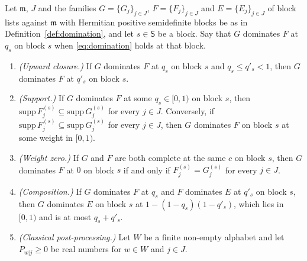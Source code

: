 
\begin{lemma}\label{lem:domination}
Let $\mathfrak{m}$, $J$ and the families $G=\{G_j\}_{j\in J}$,
$F=\{F_j\}_{j\in J}$ and $E=\{E_j\}_{j\in J}$ of block lists against
$\mathfrak{m}$ with Hermitian positive semidefinite blocks be as in
Definition~\ref{def:domination}, and let $s\in\mathsf{S}$ be a block.
Say that $G$ dominates $F$ at $q_s$ on block $s$ when
\eqref{eq:domination} holds at that block.
\begin{enumerate}[label=(\roman*),leftmargin=2.4em]
\item \emph{(Upward closure.)} If $G$ dominates $F$ at $q_s$ on block $s$ and
  $q_s\le q'_s<1$, then $G$ dominates $F$ at $q'_s$ on block $s$.
\item \emph{(Support.)} If $G$ dominates $F$ at some $q_s\in[0,1)$ on block
  $s$, then $\mathrm{supp}\,F^{(s)}_j\subseteq\mathrm{supp}\,G^{(s)}_j$ for
  every $j\in J$. Conversely, if
  $\mathrm{supp}\,F^{(s)}_j\subseteq\mathrm{supp}\,G^{(s)}_j$ for every
  $j\in J$, then $G$ dominates $F$ on block $s$ at some weight in $[0,1)$.
\item \emph{(Weight zero.)} If $G$ and $F$ are both complete at the same
  $c$ on block $s$, then $G$ dominates $F$ at $0$ on block $s$ if and only
  if $F^{(s)}_j=G^{(s)}_j$ for every $j\in J$.
\item \emph{(Composition.)} If $G$ dominates $F$ at $q_s$ and $F$ dominates
  $E$ at $q'_s$ on block $s$, then $G$ dominates $E$ on block $s$ at
  $1-(1-q_s)(1-q'_s)$, which lies in $[0,1)$ and is at most $q_s+q'_s$.
\item \emph{(Classical post-processing.)} Let $W$ be a finite non-empty
  alphabet and let $P_{w|j}\ge0$ be real numbers for $w\in W$ and $j\in J$.

\end{enumerate}
\end{lemma}
